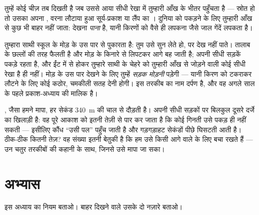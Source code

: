 \begin{proposition}[देखना काम कैसे करता है]\label{prop:g4:light-straight-lines:seeing}
तुम्हें कोई चीज़ तब दिखती है जब उससे आया  सीधी रेखा में
तुम्हारी आँख के भीतर पहुँचता है --- स्रोत हो तो उसका अपना ,
वरना लौटाया हुआ सूर्य-प्रकाश या लैंप का । दुनिया को पकड़ने के
लिए तुम्हारी आँख से कुछ भी बाहर नहीं जाता: देखना \emph{पाना} है, यानी
किरणों को वैसे ही लपकना जैसे जाल गेंदें लपकता है।
\end{proposition}

\begin{example}[मोड़ के उस पार]\label{ex:g4:light-straight-lines:corner}
तुम्हारा साथी स्कूल के मोड़ के उस पार से पुकारता है: तुम उसे सुन लेते
हो, पर देख नहीं पाते।  तालाब के छल्लों की तरह फैलती है और मोड़
के किनारे से लिपटकर आगे बह जाती है;  अपनी सीधी सड़कें पकड़े
रहता है, और ईंट में से होकर तुम्हारे साथी के चेहरे को तुम्हारी आँख से
जोड़ने वाली कोई सीधी रेखा है ही नहीं। मोड़ के उस पार देखने के लिए
तुम्हें \emph{सड़क मोड़नी} पड़ेगी --- यानी किरण को टकराकर लौटने के
लिए कोई कठोर, चमकीली सतह देनी होगी। इस तरकीब का नाम दर्पण है, और वह
अगले साल के पहले प्रकाश-अध्याय की मालिक है।
\end{example}

\begin{remark}[दौड़ का चैंपियन]\label{rem:g4:light-straight-lines:speed}
, जैसा हमने मापा, हर सेकंड \qty{340}{m} की चाल से दौड़ती है।
अपनी सीधी सड़कों पर  बिलकुल दूसरे दर्जे का खिलाड़ी है: वह पूरे
आकाश को इतनी तेज़ी से पार कर जाता है कि कोई गिनती उसे पकड़ ही नहीं
सकती --- इसीलिए कौंध ``उसी पल'' पहुँच जाती है और गड़गड़ाहट सेकंडों
पीछे घिसटती आती है। ठीक-ठीक कितनी तेज़? वह संख्या इतनी बेतुकी है कि
हम उसे किसी आगे वाले  के लिए बचा रखते हैं --- उन चतुर तरकीबों की
कहानी के साथ, जिनसे उसे मापा जा सका।
\end{remark}

\section{अभ्यास}

\begin{exercise}[$\star$]\label{exo:g4:light-straight-lines:1}
इस अध्याय का नियम बताओ। बाहर दिखने वाले उसके दो नज़ारे बताओ।
\end{exercise}

